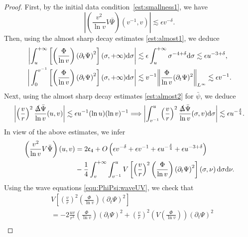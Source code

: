 \documentclass[a4paper,reqno]{amsart}
\theoremstyle{definition}
\numberwithin{equation}{section}
\def \d {{\rm{d}}}
\def \pt{\partial_{t}}
\def\Deltas{\slashed{\Delta}}
\def\ep{\epsilon}
\begin{document}
\begin{proof}
First, by the initial data condition~\eqref{est:smallness1}, we have
\begin{equation*}
   \left| \left(\frac{v^{2}}{\ln v}V\bar{\Psi}\right)(v^{-1},v)\right|\lesssim \ep v^{-\delta}.
\end{equation*}
Then, using the almost sharp decay estimates \eqref{est:almost1}, we deduce
\begin{align*}
\left|\int_{u}^{+\infty}\left[\left(\frac{\Phi}{\ln v}\right)\left(\pt \Psi\right)^{2}\right](\sigma,+\infty)\d \sigma\right|
&\lesssim \epsilon \int_{u}^{+\infty} \sigma^{-4+\delta}\d \sigma\lesssim  \ep u^{-3+\delta},\\
\bigg|\int_{0}^{v^{-1}}\left[\left(\frac{\Phi}{\ln v}\right)\left(\pt \Psi\right)^{2}\right](\sigma,+\infty)\d \sigma   \bigg|
&\lesssim v^{-1}
\bigg\|\frac{\Phi}{\ln v}(\pt \Psi)^{2}\bigg\|_{L^{\infty}}
\lesssim
\ep v^{-1}.
\end{align*}
Next, using the almost sharp decay estimates \eqref{est:almost2} for $\bar{\psi}$, we deduce 
\begin{equation*}
    \left|\left(\frac{v}{r}\right)^{2}\frac{\Deltas \bar{\Psi}}{\ln v}(u,v)\right|\lesssim \ep u^{-1}(\ln u)(\ln v)^{-1}\Longrightarrow
\left|\int_{v^{-1}}^{u}
\left(\frac{v}{r}\right)^{2}\frac{\Deltas \bar{\Psi}}{\ln v}(\sigma,v)
\d \sigma\right|\lesssim \ep u^{-\frac{\delta}{4}}.
\end{equation*}
In view of the above estimates, we infer
\begin{equation*}
\begin{aligned}
\left(\frac{v^{2}}{\ln v}V\bar{\Psi}\right)(u,v)
&=2\mathfrak{c}_{4}+O\left(\ep v^{-\delta}+\ep v^{-1}+\ep u^{-\frac{\delta}{4}}+\ep u^{-3+\delta}\right)\\
&-\frac{1}{4}\int_{v}^{+\infty}\int_{v^{-1}}^{u}V\left[\left(\frac{v}{r}\right)^{2}\left(\frac{\Phi}{\ln v}\right)\left(\pt \Psi\right)^{2}\right]\left(\sigma,\nu\right)\d \sigma \d \nu.
\end{aligned}
\end{equation*}
Using the wave equations \eqref{equ:PhiPsi:waveUV}, we check that
\begin{equation*}
\begin{aligned}
&V\left[\left(\frac{v}{r}\right)^{2}\left(\frac{\Phi}{\ln v}\right)\left(\pt \Psi\right)^{2}\right]\\
&=-2\frac{uv}{r^{3}}\left(\frac{\Phi}{\ln v}\right)\left(\pt \Psi\right)^{2}+\left(\frac{v}{r}\right)^{2}\left(V\left(\frac{\Phi}{\ln v}\right)\right)\left(\pt \Psi\right)^{2}\\

\end{aligned}
\end{equation*}
\end{proof}
\end{document}
